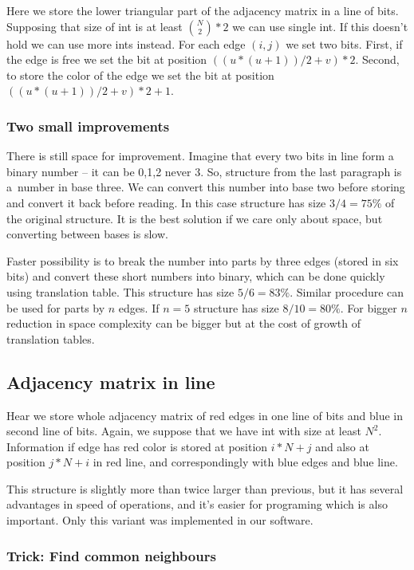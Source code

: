 Here we store the lower triangular part of the adjacency matrix in a line of
bits. Supposing that size of int is at least ${N \choose 2} * 2$ we can use
single int. If this doesn't hold we can use more ints instead. For each edge
$(i,j)$ we set two bits. First, if the edge is free we set the bit at position
$((u*(u+1))/2+v)*2$. Second, to store the color of the edge we set the bit at
position $((u*(u+1))/2+v)*2+1$.

\subsubsection{ Two small improvements }

There is still space for improvement. Imagine that every two bits in line form
a binary number \--- it can be 0,1,2 never 3. So, structure from the last
paragraph is a~number in base three. We can convert this number into base two
before storing and convert it back before reading. In this case structure has
size $ 3/4=75\% $ of the original structure. It is the best solution if we care
only about space, but converting between bases is slow.

Faster possibility is to break the number into parts by three edges (stored
in six bits) and convert these short numbers into binary, which can be done
quickly using translation table. This structure has size $5/6 = 83\% $. Similar
procedure can be used for parts by $n$ edges. If $n=5$ structure has size 
$8/10=80\%$. For bigger $n$ reduction in space complexity can be bigger
but at the cost of growth of translation tables.

\subsection{ Adjacency matrix in line}

Hear we store whole adjacency matrix of red edges in one line of bits and blue
in second line of bits. Again, we suppose that we have int with size at least
$N^2$. Information if edge has red color is stored at position $i*N+j$ and
also at position $j*N+i$ in red line, and correspondingly with blue edges and
blue line.

This structure is slightly more than twice larger than previous, but it has
several advantages in speed of operations, and it's easier for programing which
is also important. Only this variant was implemented in our software.

\subsubsection{ Trick: Find common neighbours }

